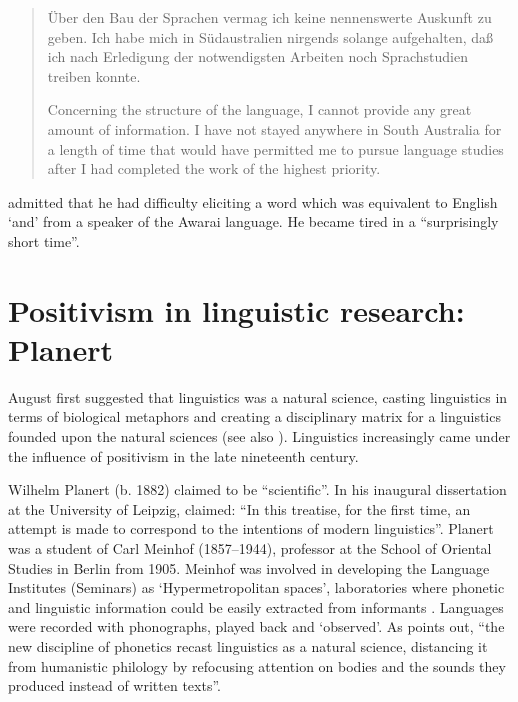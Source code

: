\documentclass[english,output=paper,colorlinks,citecolor=brown]{../langscibook}
\begin{document}
\begin{quote}
    Über den Bau der Sprachen vermag ich keine nennenswerte Auskunft zu geben. Ich habe mich in Südaustralien nirgends solange aufgehalten, daß ich nach Erledigung der notwendigsten Arbeiten noch Sprachstudien treiben konnte. 

    Concerning the structure of the language, I cannot provide any great amount of information. I have not stayed anywhere in South Australia for a length of time that would have permitted me to pursue language studies after I had completed the work of the highest priority. \citep[81]{Eylmann1908}
\end{quote}

\citet[81]{Eylmann1908} admitted that he had difficulty eliciting a word which was equivalent to English ‘and’ from a speaker of the Awarai language. He became tired in a ``surprisingly short time''.

\section{Positivism in linguistic research: Planert}

August \citet{Schleicher1983}  first suggested that linguistics was a natural science, casting linguistics in terms of biological metaphors and creating a disciplinary matrix for a linguistics founded upon the natural sciences (see also \citealt{McElvenny2018}). Linguistics increasingly came under the influence of positivism in the late nineteenth century.

Wilhelm Planert (b. 1882) claimed to be ``scientific''. In his inaugural dissertation at the University of Leipzig, \citet{Planert1907Suaheli} claimed: “In this treatise, for the first time, an attempt is made to correspond to the intentions of modern linguistics”. Planert was a student of Carl Meinhof (1857--1944), professor at the School of Oriental Studies in Berlin from 1905. Meinhof was involved in developing the Language Institutes (Seminars) as ‘Hypermetropolitan spaces’, laboratories where phonetic and linguistic information could be easily extracted from informants \citep[138]{Pugach2012}. Languages were recorded with phonographs, played back and ‘observed’. As \citet[93]{Pugach2012} points out, “the new discipline of phonetics recast linguistics as a natural science, distancing it from humanistic philology by refocusing attention on bodies and the sounds they produced instead of written texts”.
\end{document}
